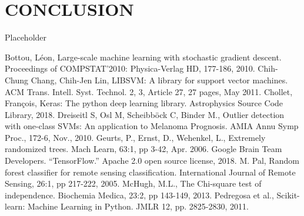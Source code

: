 \documentclass[letterpaper, 12 pt, conference]{ieeeconf}  %
\begin{document}
\section{CONCLUSION}

Placeholder

\addtolength{\textheight}{-12cm}   %








\begin{thebibliography}{99}

 Bottou, L{\' e}on, Large-scale machine learning with stochastic gradient descent. Proceedings of COMPSTAT'2010: Physica-Verlag HD, 177-186, 2010.
 Chih-Chung Chang, Chih-Jen Lin, LIBSVM: A library for support vector machines. ACM Trans. Intell. Syst. Technol. 2, 3, Article 27, 27 pages, May 2011.
 Chollet, Fran{\c c}ois, Keras: The python deep learning library. Astrophysics Source Code Library, 2018.
 Dreiseitl S, Osl M, Scheibb{\"o}ck C, Binder M., Outlier detection with one-class SVMs: An application to Melanoma Prognosis. AMIA Annu Symp Proc., 172-6, Nov., 2010.
 Geurts, P., Ernst, D., Wehenkel, L., Extremely randomized trees. Mach Learn, 63:1, pp 3-42, Apr. 2006.
 Google Brain Team Developers. “TensorFlow.” Apache 2.0 open source license, 2018.
 M. Pal, Random forest classifier for remote sensing classification. International Journal of Remote Sensing, 26:1, pp 217-222, 2005.
 McHugh, M.L., The Chi-square test of independence. Biochemia Medica, 23:2, pp 143-149, 2013.
 Pedregosa et al., Scikit-learn: Machine Learning in Python. JMLR 12, pp. 2825-2830, 2011.

\end{thebibliography}
\end{document}
